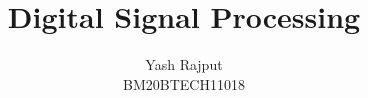 \documentclass[journal,12pt,twocolumn]{IEEEtran}
\begin{document}
\renewcommand{\thefigure}{\arabic{section}.\arabic{figure}}
\makeatletter
{}
\makeatother

\def\putbox#1#2#3{\makebox[0in][l]{\makebox[#1][l]{}\raisebox{\baselineskip}[0in][0in]{\raisebox{#2}[0in][0in]{#3}}}}
     \def\rightbox#1{\makebox[0in][r]{#1}}
     \def\centbox#1{\makebox[0in]{#1}}
     \def\topbox#1{\raisebox{-\baselineskip}[0in][0in]{#1}}
     \def\midbox#1{\raisebox{-0.5\baselineskip}[0in][0in]{#1}}

\vspace{3cm}

\title{ 
Digital Signal Processing 
}


%
%
%

\author{ Yash Rajput \\BM20BTECH11018 %
}
% 
%
\end{document}
